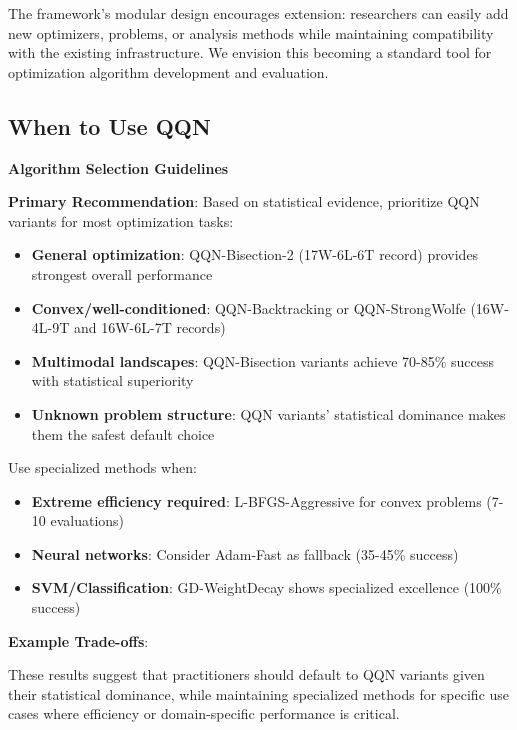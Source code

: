The framework's modular design encourages extension: researchers can easily add new optimizers, problems, or analysis methods while maintaining compatibility with the existing infrastructure. We envision this becoming a standard tool for optimization algorithm development and evaluation.

\hypertarget{when-to-use-qqn}{%
\subsection{When to Use QQN}\label{when-to-use-qqn}}

\textbf{Algorithm Selection Guidelines}

\textbf{Primary Recommendation}: Based on statistical evidence, prioritize QQN variants for most optimization tasks:

\begin{itemize}
\tightlist
\item
  \textbf{General optimization}: QQN-Bisection-2 (17W-6L-6T record) provides strongest overall performance
\item
  \textbf{Convex/well-conditioned}: QQN-Backtracking or QQN-StrongWolfe (16W-4L-9T and 16W-6L-7T records)
\item
  \textbf{Multimodal landscapes}: QQN-Bisection variants achieve 70-85\% success with statistical superiority
\item
  \textbf{Unknown problem structure}: QQN variants' statistical dominance makes them the safest default choice
\end{itemize}

Use specialized methods when:

\begin{itemize}
\tightlist
\item
  \textbf{Extreme efficiency required}: L-BFGS-Aggressive for convex problems (7-10 evaluations)
\item
  \textbf{Neural networks}: Consider Adam-Fast as fallback (35-45\% success)
\item
  \textbf{SVM/Classification}: GD-WeightDecay shows specialized excellence (100\% success)
\end{itemize}

\textbf{Example Trade-offs}:

These results suggest that practitioners should default to QQN variants given their statistical dominance, while maintaining specialized methods for specific use cases where efficiency or domain-specific performance is critical.

